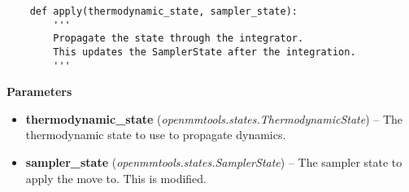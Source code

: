 \begin{description}
\item[Methods]
\item
    \begin{verbatim}
    def apply(thermodynamic_state, sampler_state):
        '''
        Propagate the state through the integrator.
        This updates the SamplerState after the integration.
        '''
    \end{verbatim}
    
    \begin{description}
    \item
        \textbf{Parameters}
    \begin{itemize}
    \item
      \textbf{thermodynamic\_state}
      (\emph{openmmtools.states.ThermodynamicState}) -- The thermodynamic
      state to use to propagate dynamics.
    \item
      \textbf{sampler\_state} (\emph{openmmtools.states.SamplerState}) --
      The sampler state to apply the move to. This is modified.
    \end{itemize}
    \end{description}
\end{description}

